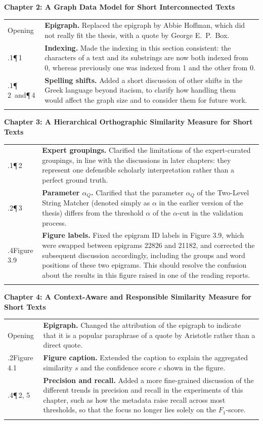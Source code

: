 \documentclass[11pt,a4paper]{article}
\makeatletter
\newcommand{\heading}[1]{%
  \par\addvspace{1.5em}%
  {\raggedright\large\bfseries #1\par}\nopagebreak[4]%
  \vspace{0.2em}\nopagebreak[4]%
}
\newlength{\loccol}
\newenvironment{changes}{%
  \begin{tabular}{@{}>{\raggedright\arraybackslash}p{\loccol}
                     >{\raggedright\arraybackslash}p{\dimexpr\textwidth-\loccol-2\tabcolsep\relax}@{}}
    \toprule
}{%
    \bottomrule
  \end{tabular}\par
}
\newcommand{\change}[2]{#1 & #2 \\ \addlinespace[0.45em]}
\newcommand{\loc}[2]{#1\enspace #2}
\newcommand{\sub}[1]{\newline{\footnotesize\itshape #1}}
\newcommand{\topic}[1]{\textbf{#1.}}
\makeatother
\begin{document}
\heading{Chapter 2: A Graph Data Model for Short Interconnected Texts}

\begin{changes}
  \change{\loc{Opening}{}}{\topic{Epigraph} Replaced the epigraph by Abbie Hoffman, which did not really fit the thesis, with a quote by George E.\ P.\ Box.}
  \change{\loc{2.3.1}{¶\,1}}{\topic{Indexing} Made the indexing in this section consistent: the characters of a text and its substrings are now both indexed from 0, whereas previously one was indexed from 1 and the other from 0.}
  \change{\loc{2.6.1}{¶\,2}\ and\newline\loc{2.7}{¶\,4}}{\topic{Spelling shifts} Added a short discussion of other shifts in the Greek language beyond itacism, to clarify how handling them would affect the graph size and to consider them for future work.}
\end{changes}

\heading{Chapter 3: A Hierarchical Orthographic Similarity Measure for Short Texts}

\begin{changes}
  \change{\loc{3.5.1}{¶\,2}}{\topic{Expert groupings} Clarified the limitations of the expert-curated groupings, in line with the discussions in later chapters: they represent one defensible scholarly interpretation rather than a perfect ground truth.}
  \change{\loc{3.5.2}{¶\,3}\sub{Two-Level String Matcher}}{\topic{Parameter $\alpha_Q$} Clarified that the parameter $\alpha_Q$ of the Two-Level String Matcher (denoted simply as $\alpha$ in the earlier version of the thesis) differs from the threshold $\alpha$ of the $\alpha$-cut in the validation process.}
  \change{\loc{3.5.4}{Figure 3.9}\sub{Query-Based Grouping of Similar Text Nodes}}{\topic{Figure labels} Fixed the epigram ID labels in Figure 3.9, which were swapped between epigrams 22826 and 21182, and corrected the subsequent discussion accordingly, including the groups and word positions of these two epigrams. This should resolve the confusion about the results in this figure raised in one of the reading reports.}
\end{changes}

\heading{Chapter 4: A Context-Aware and Responsible Similarity Measure for Short Texts}

\begin{changes}
  \change{\loc{Opening}{}}{\topic{Epigraph} Changed the attribution of the epigraph to indicate that it is a popular paraphrase of a quote by Aristotle rather than a direct quote.}
  \change{\loc{4.4.2}{Figure 4.1}}{\topic{Figure caption} Extended the caption to explain the aggregated similarity $s$ and the confidence score $c$ shown in the figure.}
  \change{\loc{4.5.4}{¶\,2, 5}\sub{Quality Measure Results}}{\topic{Precision and recall} Added a more fine-grained discussion of the different trends in precision and recall in the experiments of this chapter, such as how the metadata raise recall across most thresholds, so that the focus no longer lies solely on the $F_1$-score.}
\end{changes}
\end{document}
